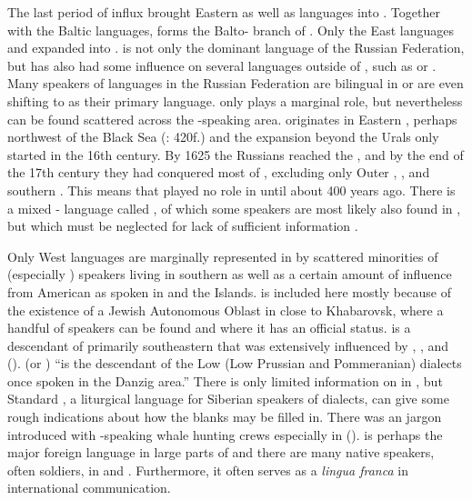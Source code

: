 The last period of  influx brought Eastern  as well as  languages into . Together with the Baltic languages,  forms the Balto- branch of . Only the East  languages  and  expanded into .  is not only the dominant language of the Russian Federation, but has also had some influence on several languages outside of , such as  or . Many speakers of languages in the Russian Federation are bilingual in  or are even shifting to  as their primary language.  only plays a marginal role, but nevertheless can be found scattered across the -speaking area.  originates in Eastern , perhaps northwest of the Black Sea (\citealt{Fortson2010}: 420f.) and the  expansion beyond the Urals only started in the 16th century. By 1625 the Russians reached the , and by the end of the 17th century they had conquered most of , excluding only Outer , , and southern  \citep[102]{Forsyth1992}. This means that  played no role in  until about 400 years ago. There is a mixed - language called , of which some speakers are most likely also found in , but which must be neglected for lack of sufficient information \citep{Bilaniuk2004}.

\largerpage[2]
Only West  languages are marginally represented in  by scattered minorities of  (especially ) speakers living in southern  as well as a certain amount of influence from American  as spoken in  and the  Islands.  is included here mostly because of the existence of a Jewish Autonomous Oblast in  close to Khabarovsk, where a handful of  speakers can be found and where it has an official status.  is a descendant of primarily southeastern  that was extensively influenced by , , and  (\citealt{JacobsPrincevanderAuwera1994}).  (or ) “is the descendant of the Low  (Low Prussian and Pommeranian) dialects once spoken in the Danzig area.” \citep[13]{Nieuweboer1999} There is only limited information on  in , but Standard , a liturgical language for Siberian speakers of  dialects, can give some rough indications about how the blanks may be filled in. There was an  jargon introduced with -speaking whale hunting crews especially in  (\citealt{deReuse1996}).  is perhaps the major foreign language in large parts of  and there are many native speakers, often soldiers, in  and . Furthermore, it often serves as a \textit{lingua franca} in international communication.

